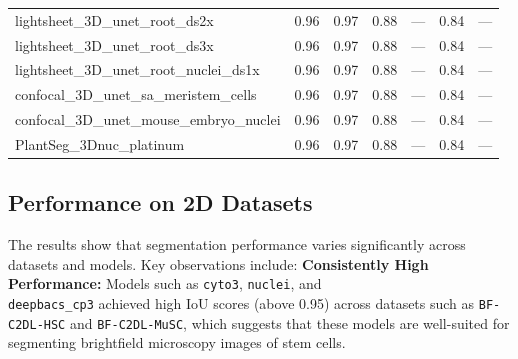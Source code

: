 \documentclass[./dissertation.tex]{subfiles}
\begin{document}
\begin{table}[htbp]
\begin{tabular}{|l|c|c|c|c|c|c|}
        lightsheet\_3D\_unet\_root\_ds2x          & 0.96                                    & 0.97                                        & 0.88                                    & ---                                   & 0.84                                   & ---                                     \\
        lightsheet\_3D\_unet\_root\_ds3x          & 0.96                                    & 0.97                                        & 0.88                                    & ---                                   & 0.84                                   & ---                                     \\
        lightsheet\_3D\_unet\_root\_nuclei\_ds1x  & 0.96                                    & 0.97                                        & 0.88                                    & ---                                   & 0.84                                   & ---                                     \\
        confocal\_3D\_unet\_sa\_meristem\_cells   & 0.96                                    & 0.97                                        & 0.88                                    & ---                                   & 0.84                                   & ---                                     \\
        confocal\_3D\_unet\_mouse\_embryo\_nuclei & 0.96                                    & 0.97                                        & 0.88                                    & ---                                   & 0.84                                   & ---                                     \\
        PlantSeg\_3Dnuc\_platinum                 & 0.96                                    & 0.97                                        & 0.88                                    & ---                                   & 0.84                                   & ---                                     \\
        \bottomrule
    \end{tabular}
\end{table}


\subsection{Performance on 2D Datasets}

The results show that segmentation performance varies significantly across datasets and models. Key observations include:
\textbf{Consistently High Performance:} Models such as \texttt{cyto3}, \texttt{nuclei}, and \\ \texttt{deepbacs\_cp3} achieved high IoU scores (above 0.95) across datasets such as \texttt{BF-C2DL-HSC} and \texttt{BF-C2DL-MuSC}, which suggests that these models are well-suited for segmenting brightfield microscopy images of stem cells. \\
\end{document}
